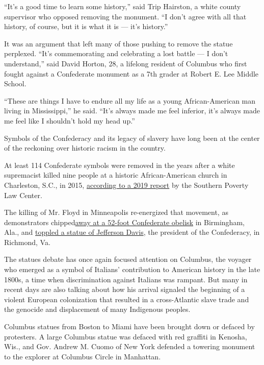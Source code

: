 ``It's a good time to learn some history,'' said Trip Hairston, a white
county supervisor who opposed removing the monument. ``I don't agree
with all that history, of course, but it is what it is --- it's
history.''

It was an argument that left many of those pushing to remove the statue
perplexed. ``It's commemorating and celebrating a lost battle --- I
don't understand,'' said David Horton, 28, a lifelong resident of
Columbus who first fought against a Confederate monument as a 7th grader
at Robert E. Lee Middle School.

``These are things I have to endure all my life as a young
African-American man living in Mississippi,'' he said. ``It's always
made me feel inferior, it's always made me feel like I shouldn't hold my
head up.''

Symbols of the Confederacy and its legacy of slavery have long been at
the center of the reckoning over historic racism in the country.

At least 114 Confederate symbols were removed in the years after a white
supremacist killed nine people at a historic African-American church in
Charleston, S.C., in 2015,
\href{https://www.splcenter.org/20190201/whose-heritage-public-symbols-confederacy}{according
to a 2019 report} by the Southern Poverty Law Center.

The killing of Mr. Floyd in Minneapolis re-energized that movement, as
demonstrators
chipped\href{https://www.nytimes3xbfgragh.onion/2020/06/02/us/george-floyd-birmingham-confederate-statue.html}{away
at a 52-foot Confederate obelisk} in Birmingham, Ala., and
\href{https://www.nytimes3xbfgragh.onion/2020/06/11/us/Jefferson-Davis-Statue-Richmond.html}{toppled
a statue of Jefferson Davis}, the president of the Confederacy, in
Richmond, Va.

The statues debate has once again focused attention on Columbus, the
voyager who emerged as a symbol of Italians' contribution to American
history in the late 1800s, a time when discrimination against Italians
was rampant. But many in recent days are also talking about how his
arrival signaled the beginning of a violent European colonization that
resulted in a cross-Atlantic slave trade and the genocide and
displacement of many Indigenous peoples.

Columbus statues from Boston to Miami have been brought down or defaced
by protesters. A large Columbus statue was defaced with red graffiti in
Kenosha, Wis., and Gov. Andrew M. Cuomo of New York defended a towering
monument to the explorer at Columbus Circle in Manhattan.

